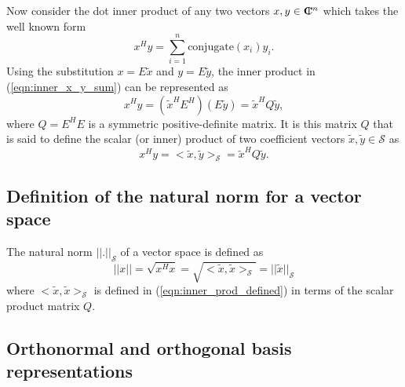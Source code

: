 \documentclass[pdf,ps2pdf,11pt]{SANDreport}
\begin{document}
Now consider the dot inner product of any two vectors $x,y\in\mbox{\textbf{C}}\hspace{-1.1ex}\mbox{l}\hspace{0.4ex}^n$ which
takes the well known form
%
\begin{equation}
x^H y = \sum_{i=1}^n \mbox{conjugate}(x_i) y_i.
\label{eqn:inner_x_y_sum}
\end{equation}
%
Using the substitution $x = E {}\tilde{x}$ and $y = E {}\tilde{y}$, the inner
product in (\ref{eqn:inner_x_y_sum}) can be represented as
%
\begin{equation}
x^H y = ( \tilde{x}^H E^H ) ( E \tilde{y} ) = \tilde{x}^H Q \tilde{y},
\label{eqn:inner_x_y_E_prod}
\end{equation}
%
where $Q = E^H E$ is a symmetric positive-definite matrix.  It is this matrix
$Q$ that is said to define the scalar (or inner) product of two coefficient
vectors $\tilde{x},\tilde{y}\in\mathcal{S}$ as
%
\begin{equation}
x^H y = <\tilde{x},\tilde{y}>_{\mathcal{S}} = \tilde{x}^H Q \tilde{y}.
\label{eqn:inner_prod_defined}
\end{equation}
%

\subsection{Definition of the natural norm for a vector space}

The natural norm $||.||_{\mathcal{S}}$ of a vector space is defined as
%
\begin{equation}
||x|| = \sqrt{x^H x} = \sqrt{<\tilde{x},\tilde{x}>_{\mathcal{S}}} = ||\tilde{x}||_{\mathcal{S}}
\label{eqn:natural_norm_defined}
\end{equation}
%
where $<\tilde{x},\tilde{x}>_{\mathcal{S}}$ is defined in
(\ref{eqn:inner_prod_defined}) in terms of the scalar product matrix $Q$.

\subsection{Orthonormal and orthogonal basis representations}
\end{document}
